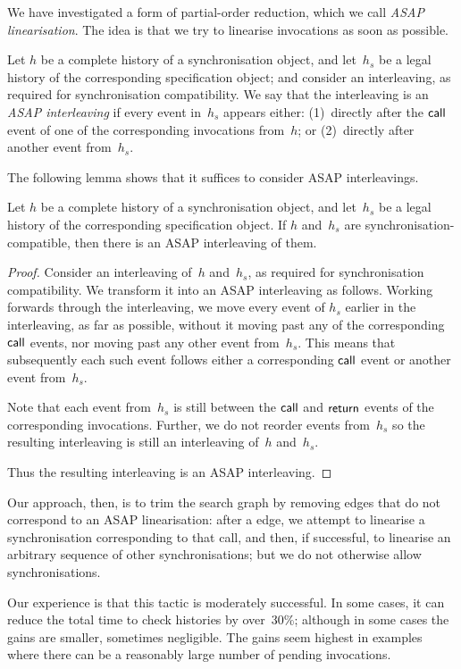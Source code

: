 We have investigated a form of partial-order reduction, which we call
\emph{ASAP linearisation}.  The idea is that we try to linearise invocations
as soon as possible.
%
\begin{definition}
Let $h$ be a complete history of a synchronisation object, and let~$h_s$ be a
legal history of the corresponding specification object; and consider an
interleaving, as required for synchronisation compatibility.  We say that the
interleaving is an \emph{ASAP interleaving} if every event in~$h_s$ appears
either: (1)~directly after the $\mathsf{call}$ event of one of the corresponding
invocations from~$h$; or (2)~directly after another event from~$h_s$.
\end{definition}
%
The following lemma shows that it suffices to consider ASAP interleavings.
%
\begin{lemma}
Let $h$ be a complete history of a synchronisation object, and let~$h_s$ be a
legal history of the corresponding specification object.  If $h$ and~$h_s$ are
synchronisation-compatible, then there is an ASAP interleaving of them.
\end{lemma}
%
\begin{proof}
Consider an interleaving of~$h$ and~$h_s$, as required for synchronisation
compatibility.  We transform it into an ASAP interleaving as follows.  Working
forwards through the interleaving, we move every event of $h_s$ earlier in the
interleaving, as far as possible, without it moving past any of the corresponding
$\mathsf{call}$ events, nor moving past any other event from~$h_s$.  This means that
subsequently each such event follows either a corresponding $\mathsf{call}$ event or
another event from~$h_s$.

Note that each event from~$h_s$ is still between the $\mathsf{call}$ and $\mathsf{return}$
events of the corresponding invocations.  Further, we do not reorder events
from~$h_s$ so the resulting interleaving is still an interleaving of~$h$
and~$h_s$.

Thus the resulting interleaving is an ASAP interleaving.
\end{proof}
%
Our approach, then, is to trim the search graph by removing
 edges that do not correspond to an ASAP
linearisation: after a  edge, we attempt to linearise a
synchronisation corresponding to that call, and then, if successful, to
linearise an arbitrary sequence of other synchronisations; but we do not
otherwise allow synchronisations.

Our experience is that this tactic is moderately successful.  In some cases,
it can reduce the total time to check histories by over~30\%;
although in some cases the gains are smaller, sometimes negligible.  The gains
seem highest in examples where there can be a reasonably large number of
pending invocations.
 
